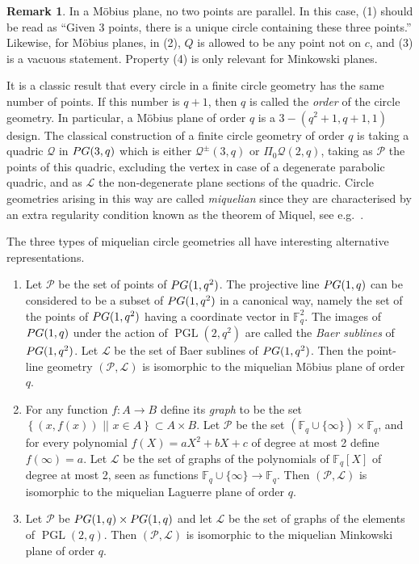 \documentclass[a4paper]{article}
\theoremstyle{definition}
\newtheorem{rmk}[thm]{Remark}
\newcommand{\FF}{\mathbb F}
\newcommand{\sett}[2]{ \left\{ #1 \, \, || \, \, #2 \right \} }
\newcommand{\pg}{\textnormal{PG}}
\newcommand{\pp}{\mathcal P}
\newcommand{\ml}{\mathcal L}
\newcommand{\mq}{\mathcal Q}
\DeclareMathOperator{\PGL}{PGL}
\begin{document}
\begin{rmk}
 In a Möbius plane, no two points are parallel.
 In this case, (1) should be read as ``Given 3 points, there is a unique circle containing these three points.''
 Likewise, for Möbius planes, in (2), $Q$ is allowed to be any point not on $c$, and (3) is a vacuous statement.
 Property (4) is only relevant for Minkowski planes.
\end{rmk}

It is a classic result that every circle in a finite circle geometry has the same number of points.
If this number is $q+1$, then $q$ is called the \emph{order} of the circle geometry.
In particular, a Möbius plane of order $q$ is a $3-(q^2+1,q+1,1)$ design.
The classical construction of a finite circle geometry of order $q$ is taking a quadric $\mq$ in $\pg(3,q)$ which is either $\mq^{\pm}(3,q)$ or $\Pi_0 \mq(2,q)$, taking as $\pp$ the points of this quadric, excluding the vertex in case of a degenerate parabolic quadric, and as $\ml$ the non-degenerate plane sections of the quadric.
Circle geometries arising in this way are called \emph{miquelian} since they are characterised by an extra regularity condition known as the theorem of Miquel, see e.g.\ \cite[\S 5.8, 5.10]{delandtsheer}.

The three types of miquelian circle geometries all have interesting alternative representations.
\begin{enumerate}
 \item Let $\pp$ be the set of points of $\pg(1,q^2)$.
 The projective line $\pg(1,q)$ can be considered to be a subset of $\pg(1,q^2)$ in a canonical way, namely the set of the points of $\pg(1,q^2)$ having a coordinate vector in $\FF_q^2$.
 The images of $\pg(1,q)$ under the action of $\PGL(2,q^2)$ are called the \emph{Baer sublines} of $\pg(1,q^2)$.
 Let $\ml$ be the set of Baer sublines of $\pg(1,q^2)$.
 Then the point-line geometry $(\pp,\ml)$ is isomorphic to the miquelian Möbius plane of order $q$.
 \item For any function $f:A \to B$ define its \emph{graph} to be the set $\sett{(x,f(x))}{ x \in A} \subset A \times B$.
 Let $\pp$ be the set $(\FF_q \cup \{\infty\}) \times \FF_q$, and for every polynomial $f(X) = a X^2 + b X + c$ of degree at most 2 define $f(\infty) = a$.
 Let $\ml$ be the set of graphs of the polynomials of $\FF_q[X]$ of degree at most 2, seen as functions $\FF_q \cup \{\infty\} \to \FF_q$.
 Then $(\pp,\ml)$ is isomorphic to the miquelian Laguerre plane of order $q$.
 \item Let $\pp$ be $\pg(1,q) \times \pg(1,q)$ and let $\ml$ be the set of graphs of the elements of $\PGL(2,q)$.
 Then $(\pp,\ml)$ is isomorphic to the miquelian Minkowski plane of order $q$.
\end{enumerate}
\end{document}
